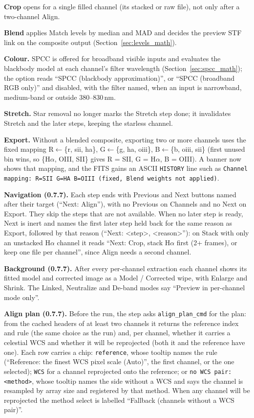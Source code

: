 \documentclass[11pt,a4paper]{article}
\newcommand{\code}[1]{\texttt{\small #1}}
\begin{document}
    \textbf{Crop} opens for a single filled channel (its stacked or raw file), not only after a two-channel Align.

    \textbf{Blend} applies Match levels by median and MAD and decides the preview STF link on the composite output (Section~\ref{sec:levels_math}).

    \textbf{Colour.} SPCC is offered for broadband visible inputs and evaluates the blackbody model at each channel's filter wavelength (Section~\ref{sec:spcc_math}); the option reads ``SPCC (blackbody approximation)'', or ``SPCC (broadband RGB only)'' and disabled, with the filter named, when an input is narrowband, medium-band or outside 380--830\,nm.

    \textbf{Stretch.} Star removal no longer marks the Stretch step done; it invalidates Stretch and the later steps, keeping the starless channel.

    \textbf{Export.} Without a blended composite, exporting two or more channels uses the fixed mapping R$\leftarrow$\{r, sii, ha\}, G$\leftarrow$\{g, ha, oiii\}, B$\leftarrow$\{b, oiii, sii\} (first unused bin wins, so \{H$\alpha$, OIII, SII\} gives R = SII, G = H$\alpha$, B = OIII). A banner now shows that mapping, and the FITS gains an ASCII \code{HISTORY} line such as \code{Channel mapping: R=SII G=HA B=OIII (fixed, Blend weights not applied)}.

    \textbf{Navigation (0.7.7).} Each step ends with Previous and Next buttons named after their target (``Next: Align''), with no Previous on Channels and no Next on Export. They skip the steps that are not available. When no later step is ready, Next is inert and names the first later step held back for the same reason as Export, followed by that reason (``Next: \textless{}step\textgreater{}, \textless{}reason\textgreater{}''): on Stack with only an unstacked H$\alpha$ channel it reads ``Next: Crop, stack H$\alpha$ first (2+ frames), or keep one file per channel'', since Align needs a second channel.

    \textbf{Background (0.7.7).} After every per-channel extraction each channel shows its fitted model and corrected image as a Model / Corrected wipe, with Enlarge and Shrink. The Linked, Neutralize and De-band modes say ``Preview in per-channel mode only''.

    \textbf{Align plan (0.7.7).} Before the run, the step asks \code{align\_plan\_cmd} for the plan: from the cached headers of at least two channels it returns the reference index and rule (the same choice as the run) and, per channel, whether it carries a celestial WCS and whether it will be reprojected (both it and the reference have one). Each row carries a chip: \code{reference}, whose tooltip names the rule (``Reference: the finest WCS pixel scale (Auto)'', the first channel, or the one selected); \code{WCS} for a channel reprojected onto the reference; or \code{no WCS pair: <method>}, whose tooltip names the side without a WCS and says the channel is resampled by array size and registered by that method. When any channel will be reprojected the method select is labelled ``Fallback (channels without a WCS pair)''.
\end{document}
